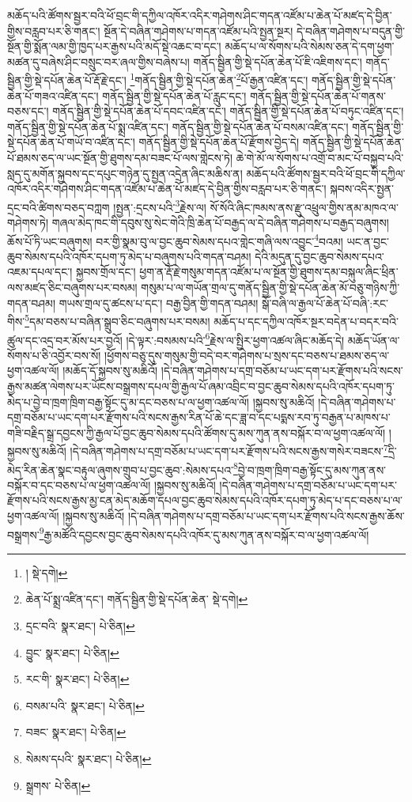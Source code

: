 མཆོད་པའི་ཚོགས་སྦྱར་བའི་ཕོ་བྲང་གི་དཀྱིལ་འཁོར་འདིར་གཤེགས་ཤིང་གདན་འཛོམ་པ་ཆེན་པོ་མཛད་དེ་བྱིན་གྱིས་བརླབ་པར་ཅི་གནང་། སྔོན་དེ་བཞིན་གཤེགས་པ་གདན་འཛོམ་པའི་སྤྱན་སྔར། དེ་བཞིན་གཤེགས་པ་བདུན་གྱི་སྔོན་གྱི་སྨོན་ལམ་གྱི་ཁྱད་པར་རྒྱས་པའི་མདོ་སྡེ་འཆང་བ་དང་། མཆོད་པ་ལ་སོགས་པའི་སེམས་ཅན་དེ་དག་ཕྱག་མཚན་དུ་བཞེས་ཤིང་བསྲུང་བར་ཞལ་གྱིས་བཞེས་པ། གནོད་སྦྱིན་གྱི་སྡེ་དཔོན་ཆེན་པོ་ཇི་འཇིགས་དང་། གནོད་སྦྱིན་གྱི་སྡེ་དཔོན་ཆེན་པོ་རྡོ་རྗེ་དང་།  \footnote{།   སྡེ་དགེ། }གནོད་སྦྱིན་གྱི་སྡེ་དཔོན་ཆེན་\footnote{ཆེན་པོ་སྨྲ་འཛིན་དང་། གནོད་སྦྱིན་གྱི་སྡེ་དཔོན་ཆེན་  སྡེ་དགེ། }པོ་རྒྱན་འཛིན་དང་། གནོད་སྦྱིན་གྱི་སྡེ་དཔོན་ཆེན་པོ་གཟའ་འཛིན་དང་། གནོད་སྦྱིན་གྱི་སྡེ་དཔོན་ཆེན་པོ་རླུང་དང་། གནོད་སྦྱིན་གྱི་སྡེ་དཔོན་ཆེན་པོ་གནས་བཅས་དང་། གནོད་སྦྱིན་གྱི་སྡེ་དཔོན་ཆེན་པོ་དབང་འཛིན་དང་། གནོད་སྦྱིན་གྱི་སྡེ་དཔོན་ཆེན་པོ་བཏུང་འཛིན་དང་། གནོད་སྦྱིན་གྱི་སྡེ་དཔོན་ཆེན་པོ་སྨྲ་འཛིན་དང་། གནོད་སྦྱིན་གྱི་སྡེ་དཔོན་ཆེན་པོ་བསམ་འཛིན་དང་། གནོད་སྦྱིན་གྱི་སྡེ་དཔོན་ཆེན་པོ་གཡོ་བ་འཛིན་དང་། གནོད་སྦྱིན་གྱི་སྡེ་དཔོན་ཆེན་པོ་རྫོགས་བྱེད་དེ། གནོད་སྦྱིན་གྱི་སྡེ་དཔོན་ཆེན་པོ་ཐམས་ཅད་ལ་ཡང་སྔོན་གྱི་ཐུགས་དམ་བཟང་པོ་ལས་གླེངས་ཏེ། ཆེ་གེ་མོ་ལ་སོགས་པ་འགྲོ་བ་མང་པོ་བསྐྱབ་པའི་སླད་དུ་མགོན་སྐྱབས་དང་དཔུང་གཉེན་དུ་སྤྱན་འདྲེན་ཞིང་མཆིས་ན། མཆོད་པའི་ཚོགས་སྦྱར་བའི་ཕོ་བྲང་གི་དཀྱིལ་འཁོར་འདིར་གཤེགས་ཤིང་གདན་འཛོམ་པ་ཆེན་པོ་མཛད་དེ་བྱིན་གྱིས་བརླབ་པར་ཅི་གནང་། སྐབས་འདིར་སྤྱན་དྲང་བའི་ཚིགས་བཅད་བཀླག །སྤྱན་:དྲངས་པའི་\footnote{དྲང་བའི་  སྣར་ཐང་།  པེ་ཅིན། }རྗེས་ལ། སོ་སོའི་ཞིང་ཁམས་ནས་རྫུ་འཕྲུལ་གྱིས་ནམ་མཁའ་ལ་གཤེགས་ཏེ། གཞལ་མེད་ཁང་གི་དབུས་སུ་སེང་གེའི་ཁྲི་ཆེན་པོ་བརྒྱད་ལ་དེ་བཞིན་གཤེགས་པ་བརྒྱད་བཞུགས། ཆོས་པོ་ཏི་ཡང་བཞུགས། བར་གྱི་སྣམ་བུ་ལ་བྱང་ཆུབ་སེམས་དཔའ་གླེང་གཞི་ལས་འབྱུང་\footnote{བྱུང་  སྣར་ཐང་།  པེ་ཅིན། }བའམ། ཡང་ན་བྱང་ཆུབ་སེམས་དཔའི་འཁོར་དཔག་ཏུ་མེད་པ་བཞུགས་པའི་གདན་བཤམ། དེའི་མདུན་དུ་བྱང་ཆུབ་སེམས་དཔའ་འཇམ་དཔལ་དང་། སྐྱབས་གྲོལ་དང་། ཕྱག་ན་རྡོ་རྗེ་གསུམ་གདན་འཛོམ་པ་ལ་སྔོན་གྱི་ཐུགས་དམ་བསྐུལ་ཞིང་ཕྲིན་ལས་མཛད་ཅིང་བཞུགས་པར་བསམ། གསུམ་པ་ལ་གཡོན་གྲལ་དུ་གནོད་སྦྱིན་གྱི་སྡེ་དཔོན་ཆེན་མོ་བཅུ་གཉིས་ཀྱི་གདན་བཤམ། གཡས་གྲལ་དུ་ཚངས་པ་དང་། བརྒྱ་བྱིན་གྱི་གདན་བཤམ། སྒོ་བཞི་ལ་རྒྱལ་པོ་ཆེན་པོ་བཞི་:རང་གིས་\footnote{རང་གི་  སྣར་ཐང་།  པེ་ཅིན། }དམ་བཅས་པ་བཞིན་སྒྲུབ་ཅིང་བཞུགས་པར་བསམ། མཆོད་པ་དང་དཀྱིལ་འཁོར་སྔར་བདེན་པ་བདར་བའི་ཚུལ་དང་འདྲ་བར་མོས་པར་བྱའོ། །དེ་ལྟར་:བསམས་པའི་\footnote{བསམ་པའི་  སྣར་ཐང་།  པེ་ཅིན། }རྗེས་ལ་སྤྱིར་ཕྱག་འཚལ་ཞིང་མཆོད་དེ། མཆོད་ཡོན་ལ་སོགས་པ་ཅི་འབྱོར་བས་སོ། །ཕྱོགས་བཅུ་དུས་གསུམ་གྱི་བདེ་བར་གཤེགས་པ་སྲས་དང་བཅས་པ་ཐམས་ཅད་ལ་ཕྱག་འཚལ་ལོ། །མཆོད་དོ་སྐྱབས་སུ་མཆིའོ། །དེ་བཞིན་གཤེགས་པ་དགྲ་བཅོམ་པ་ཡང་དག་པར་རྫོགས་པའི་སངས་རྒྱས་མཚན་ལེགས་པར་ཡོངས་བསྒྲགས་དཔལ་གྱི་རྒྱལ་པོ་ཞམ་འབྲིང་བ་བྱང་ཆུབ་སེམས་དཔའི་འཁོར་དཔག་ཏུ་མེད་པ་བྱེ་བ་ཁྲག་ཁྲིག་བརྒྱ་སྟོང་དུ་མ་དང་བཅས་པ་ལ་ཕྱག་འཚལ་ལོ། །སྐྱབས་སུ་མཆིའོ། །དེ་བཞིན་གཤེགས་པ་དགྲ་བཅོམ་པ་ཡང་དག་པར་རྫོགས་པའི་སངས་རྒྱས་རིན་པོ་ཆེ་དང་ཟླ་བ་དང་པདྨས་རབ་ཏུ་བརྒྱན་པ་མཁས་པ་གཟི་བརྗིད་སྒྲ་དབྱངས་ཀྱི་རྒྱལ་པོ་བྱང་ཆུབ་སེམས་དཔའི་ཚོགས་དུ་མས་ཀུན་ནས་བསྐོར་བ་ལ་ཕྱག་འཚལ་ལོ། །སྐྱབས་སུ་མཆིའོ། །དེ་བཞིན་གཤེགས་པ་དགྲ་བཅོམ་པ་ཡང་དག་པར་རྫོགས་པའི་སངས་རྒྱས་གསེར་བཟངས་\footnote{བཟང་  སྣར་ཐང་།  པེ་ཅིན། }དྲི་མེད་རིན་ཆེན་སྣང་བརྟུལ་ཞུགས་གྲུབ་པ་བྱང་ཆུབ་:སེམས་དཔའ་\footnote{སེམས་དཔའི་  སྣར་ཐང་།  པེ་ཅིན། }བྱེ་བ་ཁྲག་ཁྲིག་བརྒྱ་སྟོང་དུ་མས་ཀུན་ནས་བསྐོར་བ་དང་བཅས་པ་ལ་ཕྱག་འཚལ་ལོ། །སྐྱབས་སུ་མཆིའོ། །དེ་བཞིན་གཤེགས་པ་དགྲ་བཅོམ་པ་ཡང་དག་པར་རྫོགས་པའི་སངས་རྒྱས་མྱ་ངན་མེད་མཆོག་དཔལ་བྱང་ཆུབ་སེམས་དཔའི་འཁོར་དཔག་ཏུ་མེད་པ་དང་བཅས་པ་ལ་ཕྱག་འཚལ་ལོ། །སྐྱབས་སུ་མཆིའོ། །དེ་བཞིན་གཤེགས་པ་དགྲ་བཅོམ་པ་ཡང་དག་པར་རྫོགས་པའི་སངས་རྒྱས་ཆོས་བསྒྲགས་\footnote{སྒྲགས་  པེ་ཅིན། }རྒྱ་མཚོའི་དབྱངས་བྱང་ཆུབ་སེམས་དཔའི་འཁོར་དུ་མས་ཀུན་ནས་བསྐོར་བ་ལ་ཕྱག་འཚལ་ལོ། 